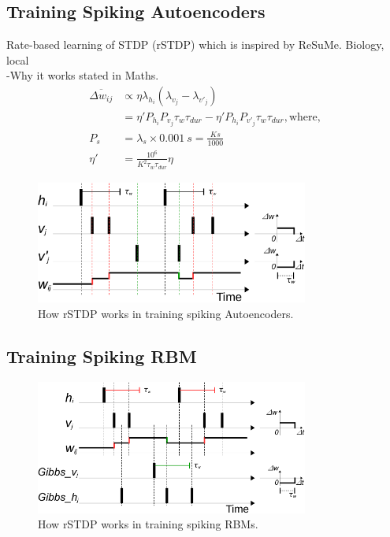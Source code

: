 \subsection{Training Spiking Autoencoders}
Rate-based learning of STDP (rSTDP) which is inspired by ReSuMe.
Biology, local\\
-Why it works stated in Maths.\\
\begin{equation}
\begin{aligned}
\overline{\Delta w_{ij}} &\propto \eta \lambda_{h_i}(\lambda_{v_j} - \lambda_{v'_j})\\
&=\eta'P_{h_i}P_{v_j}\tau_{w} \tau_{dur} - \eta'P_{h_i}P_{v'_j}\tau_{w} \tau_{dur}, \textrm{where,}\\
P_{s} &= \lambda_{s} \times 0.001~s = \frac{K s}{1000}\\
\eta' &= \frac{10^6}{K^2 \tau_{w} \tau_{dur}} \eta
\end{aligned}
\end{equation}
\begin{figure}
	\centering
	\includegraphics[width=0.8\textwidth]{pics_sdlm/rSTDP.pdf}
	\caption{How rSTDP works in training spiking Autoencoders.}
	\label{fig:rSTDP}
\end{figure}

\subsection{Training Spiking RBM}
\begin{figure}
	\centering
	\includegraphics[width=0.8\textwidth]{pics_sdlm/rSTDP_rbm.pdf}
	\caption{How rSTDP works in training spiking RBMs.}
	\label{fig:rSTDP_rbm}
\end{figure}


